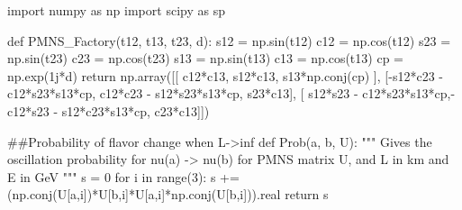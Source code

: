 \documentclass[
  letterpaper,
  DIV=11,
  numbers=noendperiod]{scrreprt}
\newenvironment{Shaded}{\begin{snugshade}}{\end{snugshade}}
\newcommand{\BuiltInTok}[1]{\textcolor[rgb]{0.00,0.23,0.31}{#1}}
\newcommand{\CommentTok}[1]{\textcolor[rgb]{0.37,0.37,0.37}{#1}}
\newcommand{\ControlFlowTok}[1]{\textcolor[rgb]{0.00,0.23,0.31}{#1}}
\newcommand{\DecValTok}[1]{\textcolor[rgb]{0.68,0.00,0.00}{#1}}
\newcommand{\ImportTok}[1]{\textcolor[rgb]{0.00,0.46,0.62}{#1}}
\newcommand{\KeywordTok}[1]{\textcolor[rgb]{0.00,0.23,0.31}{#1}}
\newcommand{\NormalTok}[1]{\textcolor[rgb]{0.00,0.23,0.31}{#1}}
\newcommand{\OperatorTok}[1]{\textcolor[rgb]{0.37,0.37,0.37}{#1}}
\newcommand{\OtherTok}[1]{\textcolor[rgb]{0.00,0.23,0.31}{#1}}
\begin{document}
\begin{Shaded}
\begin{Highlighting}[]
\ImportTok{import}\NormalTok{ numpy }\ImportTok{as}\NormalTok{ np}
\ImportTok{import}\NormalTok{ scipy }\ImportTok{as}\NormalTok{ sp}

\KeywordTok{def}\NormalTok{ PMNS\_Factory(t12, t13, t23, d):}
\NormalTok{    s12 }\OperatorTok{=}\NormalTok{ np.sin(t12)}
\NormalTok{    c12 }\OperatorTok{=}\NormalTok{ np.cos(t12)}
\NormalTok{    s23 }\OperatorTok{=}\NormalTok{ np.sin(t23)}
\NormalTok{    c23 }\OperatorTok{=}\NormalTok{ np.cos(t23)}
\NormalTok{    s13 }\OperatorTok{=}\NormalTok{ np.sin(t13)}
\NormalTok{    c13 }\OperatorTok{=}\NormalTok{ np.cos(t13)}
\NormalTok{    cp  }\OperatorTok{=}\NormalTok{ np.exp(}\OtherTok{1j}\OperatorTok{*}\NormalTok{d)}
    \ControlFlowTok{return}\NormalTok{ np.array([[ c12}\OperatorTok{*}\NormalTok{c13, s12}\OperatorTok{*}\NormalTok{c13, s13}\OperatorTok{*}\NormalTok{np.conj(cp) ],}
\NormalTok{                  [}\OperatorTok{{-}}\NormalTok{s12}\OperatorTok{*}\NormalTok{c23 }\OperatorTok{{-}}\NormalTok{ c12}\OperatorTok{*}\NormalTok{s23}\OperatorTok{*}\NormalTok{s13}\OperatorTok{*}\NormalTok{cp, c12}\OperatorTok{*}\NormalTok{c23 }\OperatorTok{{-}}\NormalTok{ s12}\OperatorTok{*}\NormalTok{s23}\OperatorTok{*}\NormalTok{s13}\OperatorTok{*}\NormalTok{cp, s23}\OperatorTok{*}\NormalTok{c13],}
\NormalTok{                  [ s12}\OperatorTok{*}\NormalTok{s23 }\OperatorTok{{-}}\NormalTok{ c12}\OperatorTok{*}\NormalTok{s23}\OperatorTok{*}\NormalTok{s13}\OperatorTok{*}\NormalTok{cp,}\OperatorTok{{-}}\NormalTok{c12}\OperatorTok{*}\NormalTok{s23 }\OperatorTok{{-}}\NormalTok{ s12}\OperatorTok{*}\NormalTok{c23}\OperatorTok{*}\NormalTok{s13}\OperatorTok{*}\NormalTok{cp, c23}\OperatorTok{*}\NormalTok{c13]])}

\CommentTok{\#\#Probability of flavor change when L{-}\textgreater{}inf}
\KeywordTok{def}\NormalTok{ Prob(a, b, U):}
    \CommentTok{"""}
\CommentTok{    Gives the oscillation probability for nu(a) {-}\textgreater{} nu(b)}
\CommentTok{    for PMNS matrix U, and L in km and E in GeV}
\CommentTok{    """}
\NormalTok{    s }\OperatorTok{=} \DecValTok{0}
    \ControlFlowTok{for}\NormalTok{ i }\KeywordTok{in} \BuiltInTok{range}\NormalTok{(}\DecValTok{3}\NormalTok{):}
\NormalTok{            s }\OperatorTok{+=}\NormalTok{ (np.conj(U[a,i])}\OperatorTok{*}\NormalTok{U[b,i]}\OperatorTok{*}\NormalTok{U[a,i]}\OperatorTok{*}\NormalTok{np.conj(U[b,i])).real}
    \ControlFlowTok{return}\NormalTok{ s}



\end{Highlighting}
\end{Shaded}
\end{document}
